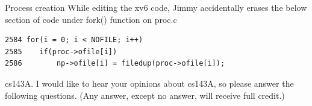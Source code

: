 \documentclass[11pt]{exam}
\begin{document}
\begin{questions}
\begin{parts}
\end{parts}

\addpoints
\question Process creation
While editing the xv6 code, Jimmy accidentally erases the below section of
code under fork() function on proc.c
\begin{verbatim}
2584 for(i = 0; i < NOFILE; i++)
2585    if(proc->ofile[i])
2586        np->ofile[i] = filedup(proc->ofile[i]);
\end{verbatim}


\newpage
\addpoints

\question cs143A. I would like to hear your opinions about cs143A, so please answer the following questions. (Any answer, except
no answer, will receive full credit.)


\end{questions}
\end{document}
